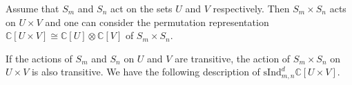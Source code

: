 \documentclass[12pt,reqno]{amsart}
\theoremstyle{definition}
\theoremstyle{remark}
\newcommand{\ind}{\mathrm{sInd}_{m,n}^{d}}
\begin{document}
Assume that $S_m$ and $S_n$ act on the sets $U$ and $V$ respectively. Then $S_{m}\times S_n$ acts on $U\times V$ and one can consider the permutation representation $\mathbb{C}[U\times V]\cong \mathbb{C}[U]\otimes \mathbb{C}[V]$ of $S_{m}\times S_{n}$. 

If the actions of $S_{m}$ and $S_{n}$ on $U$ and $V$ are transitive, the action of $S_{m}\times S_{n}$ on $U\times V$ is also transitive.  We have the following description of $\ind \mathbb{C}[U\times V]$.

\end{document}
